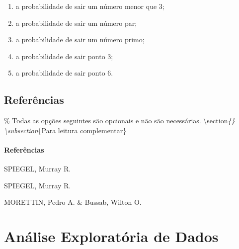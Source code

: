 \documentclass[
]{book}
\providecommand{\tightlist}{%
  \setlength{\itemsep}{0pt}\setlength{\parskip}{0pt}}
\begin{document}
\begin{enumerate}
\def\labelenumi{\alph{enumi})}
\tightlist
\item
  a probabilidade de sair um número menor que 3;
\item
  a probabilidade de sair um número par;
\item
  a probabilidade de sair um número primo;
\item
  a probabilidade de sair ponto 3;
\item
  a probabilidade de sair ponto 6.
\end{enumerate}

\section{Referências}

\% Todas as opções seguintes são opcionais e não são necessárias.
\appendix
\textbackslash section\emph{\{\appendixname\}
\textbackslash subsection}\{Para leitura complementar\}

\begin{frame} %
  \frametitle<presentation>{Referências}
    
  \begin{thebibliography}{10}
    
  \beamertemplatebookbibitems

   SPIEGEL, Murray R. 

  SPIEGEL, Murray R.
     
   MORETTIN, Pedro A. \& Bussab, Wilton O. 
   

   
  \beamertemplatearticlebibitems
  \end{thebibliography}
\end{frame}

\hypertarget{anuxe1lise-exploratuxf3ria-de-dados}{%
\chapter{Análise Exploratória de Dados}\label{anuxe1lise-exploratuxf3ria-de-dados}}
\end{document}
